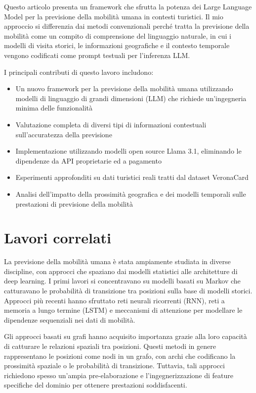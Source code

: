 \documentclass[12pt,a4paper]{article}
\begin{document}
Questo articolo presenta un framework che sfrutta la potenza dei Large Language Model per la previsione della mobilità umana in contesti turistici. Il mio approccio si differenzia dai metodi convenzionali perché tratta la previsione della mobilità come un compito di comprensione del linguaggio naturale, in cui i modelli di visita storici, le informazioni geografiche e il contesto temporale vengono codificati come prompt testuali per l'inferenza LLM.

I principali contributi di questo lavoro includono:

\begin{itemize}
\item Un nuovo framework per la previsione della mobilità umana utilizzando modelli di linguaggio di grandi dimensioni (LLM) che richiede un'ingegneria minima delle funzionalità
\item Valutazione completa di diversi tipi di informazioni contestuali sull'accuratezza della previsione
\item Implementazione utilizzando modelli open source Llama 3.1, eliminando le dipendenze da API proprietarie ed a pagamento
\item Esperimenti approfonditi su dati turistici reali tratti dal dataset VeronaCard
\item Analisi dell'impatto della prossimità geografica e dei modelli temporali sulle prestazioni di previsione della mobilità
\end{itemize}


\newpage

\section{Lavori correlati}

La previsione della mobilità umana è stata ampiamente studiata in diverse discipline, con approcci che spaziano dai modelli statistici alle architetture di deep learning. I primi lavori si concentravano su modelli basati su Markov che catturavano le probabilità di transizione tra posizioni sulla base di modelli storici. Approcci più recenti hanno sfruttato reti neurali ricorrenti (RNN), reti a memoria a lungo termine (LSTM) e meccanismi di attenzione per modellare le dipendenze sequenziali nei dati di mobilità.

Gli approcci basati su grafi hanno acquisito importanza grazie alla loro capacità di catturare le relazioni spaziali tra posizioni. Questi metodi in genere rappresentano le posizioni come nodi in un grafo, con archi che codificano la prossimità spaziale o le probabilità di transizione. Tuttavia, tali approcci richiedono spesso un'ampia pre-elaborazione e l'ingegnerizzazione di feature specifiche del dominio per ottenere prestazioni soddisfacenti.
\end{document}
